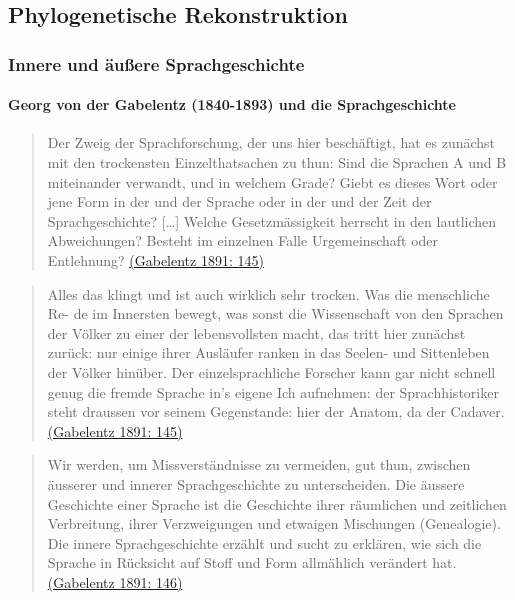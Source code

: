 
\subsection{Phylogenetische Rekonstruktion}

\subsubsection{Innere und äußere Sprachgeschichte}

\paragraph{Georg von der Gabelentz (1840-1893) und die Sprachgeschichte}

\begin{quote}
Der Zweig der Sprachforschung, der uns hier beschäftigt, hat es zunächst
mit den trockensten Einzelthatsachen zu thun: Sind die Sprachen A und B
miteinander verwandt, und in welchem Grade? Giebt es dieses Wort oder
jene Form in der und der Sprache oder in der und der Zeit der
Sprachgeschichte? {[}\ldots{}{]} Welche Gesetzmässigkeit herrscht in den
lautlichen Abweichungen? Besteht im einzelnen Falle Urgemeinschaft oder
Entlehnung?
\href{http://bibliography.lingpy.org?key=Gabelentz1891}{(Gabelentz 1891:
145)}
\end{quote}



\begin{quote}
Alles das klingt und ist auch wirklich sehr trocken. Was die menschliche
Re- de im Innersten bewegt, was sonst die Wissenschaft von den Sprachen
der Völker zu einer der lebensvollsten macht, das tritt hier zunächst
zurück: nur einige ihrer Ausläufer ranken in das Seelen- und Sittenleben
der Völker hinüber. Der einzelsprachliche Forscher kann gar nicht
schnell genug die fremde Sprache in's eigene Ich aufnehmen: der
Sprachhistoriker steht draussen vor seinem Gegenstande: hier der Anatom,
da der Cadaver.
\href{http://bibliography.lingpy.org?key=Gabelentz1891}{(Gabelentz 1891:
145)}
\end{quote}





\begin{quote}
Wir werden, um Missverständnisse zu vermeiden, gut thun, zwischen
äusserer und innerer Sprachgeschichte zu unterscheiden. Die äussere
Geschichte einer Sprache ist die Geschichte ihrer räumlichen und
zeitlichen Verbreitung, ihrer Verzweigungen und etwaigen Mischungen
(Genealogie). Die innere Sprachgeschichte erzählt und sucht zu erklären,
wie sich die Sprache in Rücksicht auf Stoff und Form allmählich
verändert hat.
\href{http://bibliography.lingpy.org?key=Gabelentz1891}{(Gabelentz 1891:
146)}
\end{quote}



